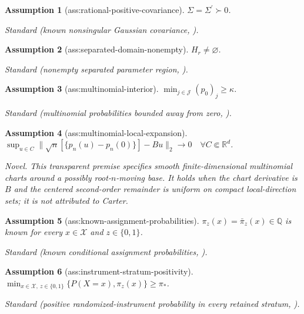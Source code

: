 \documentclass{article}
\newtheorem{assumption}{Assumption}
\begin{document}
\begin{assumption}[ass:rational-positive-covariance]\label{ass:rational-positive-covariance}
\(\Sigma=\Sigma^{\prime}\succ0\).
\par\smallskip\noindent\emph{Standard} (known nonsingular Gaussian covariance, \cite{ArmstrongKolesar2021ATE}).
\end{assumption}

\begin{assumption}[ass:separated-domain-nonempty]\label{ass:separated-domain-nonempty}
\(H_r\ne\varnothing\).
\par\smallskip\noindent\emph{Standard} (nonempty separated parameter region, \cite{GoldenshlugerJuditskyNemirovski2015}).
\end{assumption}

\begin{assumption}[ass:multinomial-interior]\label{ass:multinomial-interior}
\(\min_{j\in\mathcal J}(p_0)_j\ge\kappa\).
\par\smallskip\noindent\emph{Standard} (multinomial probabilities bounded away from zero, \cite{Carter2002MultinomialGaussian}).
\end{assumption}

\begin{assumption}[ass:multinomial-local-expansion]\label{ass:multinomial-local-expansion}
\(\sup_{u\in C}\|\sqrt n[\{p_n(u)-p_n(0)\}]-Bu\|_2\to0\quad\forall C\Subset\mathbb R^d\).
\par\smallskip\noindent\emph{Novel.} This transparent premise specifies smooth finite-dimensional multinomial charts around a possibly root-\(n\)-moving base. It holds when the chart derivative is \(B\) and the centered second-order remainder is uniform on compact local-direction sets; it is not attributed to Carter.
\end{assumption}

\begin{assumption}[ass:known-assignment-probabilities]\label{ass:known-assignment-probabilities}
\(\pi_z(x)=\bar\pi_z(x)\in\mathbb Q\) is known for every \(x\in\mathcal X\) and \(z\in\{0,1\}\).
\par\smallskip\noindent\emph{Standard} (known conditional assignment probabilities, \cite{ChenFlores2015}).
\end{assumption}

\begin{assumption}[ass:instrument-stratum-positivity]\label{ass:instrument-stratum-positivity}
\(\min_{x\in\mathcal X,\ z\in\{0,1\}}\{P(X=x),\pi_z(x)\}\ge\pi_{*}\).
\par\smallskip\noindent\emph{Standard} (positive randomized-instrument probability in every retained stratum, \cite{ChenFlores2015}).
\end{assumption}
\end{document}
